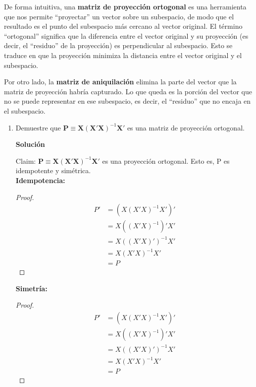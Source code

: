\documentclass[a4paper, answers, addpoints, 11pt]{exam}
\newenvironment{solucion}{%
  \begin{mdframed}[
    backgroundcolor=blue!5,    %
    linecolor=blue!50,          %
    linewidth=2pt,              %
    leftmargin=10pt,            %
    rightmargin=8pt,           %
    topline=true,              %
    bottomline=true,            %
    roundcorner=10pt,           %
    innerleftmargin=10pt,       %
    innerrightmargin=10pt,      %
    innerbottommargin=10pt,     %
    innertopmargin=10pt         %
  ]%
  \begin{tcolorbox}[colframe=blue!50!black, colback=blue!50, coltitle=white, sharp corners=all, boxrule=1mm, width=\textwidth, halign=left, valign=center, top=0mm, bottom=0mm, left=0mm, right=0mm] \textbf{Solución} \end{tcolorbox} }{\end{mdframed}}
\begin{document}
\begin{enumerate}
    De forma intuitiva, una \textbf{matriz de proyección ortogonal} es una herramienta que nos permite ``proyectar'' un vector sobre un subespacio, de modo que el resultado es el punto del subespacio más cercano al vector original. El término ``ortogonal'' significa que la diferencia entre el vector original y su proyección (es decir, el ``residuo'' de la proyección) es perpendicular al subespacio. Esto se traduce en que la proyección minimiza la distancia entre el vector original y el subespacio.
    
    \bigskip Por otro lado, la \textbf{matriz de aniquilación} elimina la parte del vector que la matriz de proyección habría capturado. Lo que queda es la porción del vector que no se puede representar en ese subespacio, es decir, el ``residuo'' que no encaja en el subespacio. \\
    
    \begin{enumerate}
        \item Demuestre que \(\mathbf{P} \equiv \mathbf{X}(\mathbf{X'}\mathbf{X})^{-1}\mathbf{X'}\) es una matriz de proyección ortogonal.
         \begin{solucion}
 Claim: \(\mathbf{P} \equiv \mathbf{X}(\mathbf{X'}\mathbf{X})^{-1}\mathbf{X'}\) es una proyección ortogonal. Esto es, P es idempotente y simétrica.\\
\textbf{Idempotencia:}
\begin{proof}
\begin{align*}
    P' &= \left( X(X'X)^{-1}X' \right)' \\
    &= X \left( (X'X)^{-1} \right)' X' \\
    &= X \left( (X'X)' \right)^{-1} X' \\
    &= X (X'X)^{-1} X' \\
    &= P
\end{align*}
\end{proof}

\textbf{Simetría:}
\begin{proof}
\begin{align*}
    P' &= \left( X(X'X)^{-1}X' \right)' \\
    &= X \left( (X'X)^{-1} \right)' X' \\
    &= X \left( (X'X)' \right)^{-1} X' \\
    &= X (X'X)^{-1} X' \\
    &= P
\end{align*}
\end{proof}


\end{solucion}
\end{enumerate}
\end{enumerate}
\end{document}
